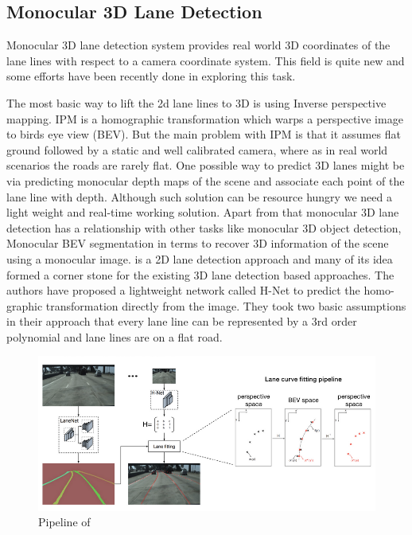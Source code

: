         \subsection{Monocular 3D Lane Detection}
        Monocular 3D lane detection system provides real world 3D coordinates of the lane lines with respect to a camera coordinate system. This field is quite new and some efforts have been recently done in exploring this task. 
 
The most basic way to lift the 2d lane lines to 3D is using Inverse perspective mapping. IPM is a homographic transformation which warps a perspective image to birds eye view (BEV). But the main problem with IPM is that it assumes flat ground followed by a static and well calibrated camera, where as in real world scenarios the roads are rarely flat. One possible way to predict 3D lanes might be via predicting monocular depth maps of the scene and associate each point of the lane line with depth. Although such solution can be resource hungry we need a light weight and real-time working solution. Apart from that monocular 3D lane detection has a relationship with other tasks like monocular 3D object detection, Monocular BEV segmentation in terms to recover 3D information of the scene using a monocular image.
\cite{DBLP:journals/corr/abs-1802-05591} is a 2D lane detection approach and many of its idea formed a corner stone for the existing 3D lane detection based approaches. The authors have proposed a lightweight network called H-Net to predict the homo-graphic transformation directly from the image. They took two basic assumptions in their approach that every lane line can be represented by a 3rd order polynomial and lane lines are on a flat road. 

 \begin{figure}[h]
    \centering
    \includegraphics[width=\textwidth]{images/lanenet.png}
    \caption{Pipeline of \cite{DBLP:journals/corr/abs-1802-05591}}
    \end{figure}


